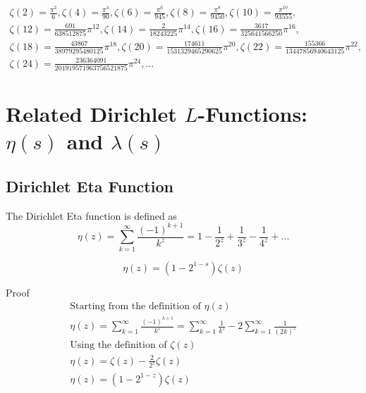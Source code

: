 \documentclass[a4paper]{article}
\begin{document}
\begin{gather*}
\zeta(2) = \frac{\pi^2}{6}, 
\zeta(4) = \frac{\pi^4}{90},
\zeta(6) = \frac{\pi^6}{945},
\zeta(8) = \frac{\pi^8}{9450},
\zeta(10) = \frac{\pi^{10}}{93555},
\\
\zeta(12) = \frac{691}{638512875} \pi^{12},
\zeta(14) = \frac{2}{18243225} \pi^{14},
\zeta(16) = \frac{3617}{325641566250} \pi^{16},
\\
\zeta(18) = \frac{43867}{38979295480125} \pi^{18},
\zeta(20) = \frac{174611}{1531329465290625} \pi^{20},
\zeta(22) = \frac{155366}{13447856940643125} \pi^{22},
\\
\zeta(24) = \frac{236364091}{201919571963756521875} \pi^{24},
\dots
\end{gather*}

\pagebreak

\section{Related Dirichlet \texorpdfstring{$L$}{L}-Functions: \texorpdfstring{$\eta(s)$ and $\lambda(s)$}{eta(s) and lambda(s)}}\label{zf:sec:related-functions}

\subsection{Dirichlet Eta Function}

\begin{definition}\label{zf:Dirichlet Eta Function def}
The Dirichlet Eta function is defined as 
$$
\eta(z) = \sum_{k=1}^{\infty} \frac{(-1)^{k+1}}{k^z} = 1 - \frac{1}{2^z} +  \frac{1}{3^z} -  \frac{1}{4^z} + ...
$$
\end{definition}

\begin{theorem}
\begin{equation}
\boxed{
\eta(z) = (1 - 2^{1-s}) \zeta(z)
}
\end{equation}

Proof
\\
\begin{gather*}
\text{Starting from the definition of $\eta(z)$}
\\
\eta(z) 
=
\sum_{k=1}^{\infty} \frac{(-1)^{k+1}}{k^z}
=
\sum_{k=1}^{\infty} \frac{1}{k^z} - 2 \sum_{k=1}^{\infty} \frac{1}{(2k)^z}
\\
\text{Using the definition of $\zeta(z)$}
\\
\eta(z) 
=
\zeta(z) - \frac{2}{2^{z}} \zeta(z)
\\
\eta(z) = (1 - 2^{1-z}) \zeta(z)
\end{gather*}
\end{theorem}
\end{document}
